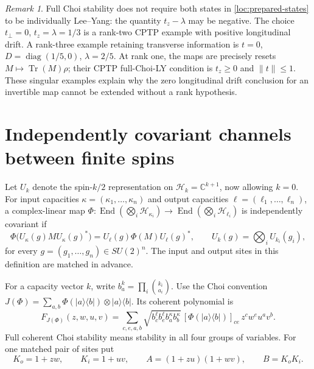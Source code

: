 \documentclass[reqno]{amsart}
\theoremstyle{definition}
\theoremstyle{remark}
\newtheorem{remark}[theorem]{Remark}
\newcommand{\C}{\mathbb C}
\DeclareMathOperator{\Tr}{Tr}
\DeclareMathOperator{\diag}{diag}
\begin{document}
\begin{remark}\label{loc:singular-distinction}
Full Choi stability does not require both states in
\eqref{loc:prepared-states} to be individually Lee--Yang: the quantity
$t_z-\lambda$ may be negative.  The choice
$t_\perp=0$, $t_z=\lambda=1/3$ is a rank-two CPTP example with
positive longitudinal drift.  A rank-three example retaining transverse
information is $t=0$, $D=\diag(1/5,0)$, $\lambda=2/5$.
At rank one, the maps are precisely resets
$M\mapsto\Tr(M)\rho$; their CPTP full-Choi-LY condition is
$t_z\geq0$ and $\|t\|\leq1$.
These singular examples explain why the zero longitudinal drift conclusion for an
invertible map cannot be extended without a rank hypothesis.
\end{remark}


\section{Independently covariant channels between finite spins}\label{spin:section}

Let $U_k$ denote the spin-$k/2$ representation on
$\mathcal H_k=\C^{k+1}$, now allowing $k=0$.
For input capacities $\kappa=(\kappa_1,\ldots,\kappa_n)$ and output
capacities $\ell=(\ell_1,\ldots,\ell_n)$, a complex-linear map
$\Phi:\operatorname{End}(\bigotimes_i\mathcal H_{\kappa_i})
\to\operatorname{End}(\bigotimes_i\mathcal H_{\ell_i})$
is independently covariant if
\begin{equation}\label{spin:covariance}
 \Phi\bigl(U_\kappa(g)MU_\kappa(g)^*\bigr)
 =U_\ell(g)\Phi(M)U_\ell(g)^*,\qquad
 U_k(g)=\bigotimes_iU_{k_i}(g_i),
\end{equation}
for every $g=(g_1,\ldots,g_n)\in SU(2)^n$.
The input and output sites in this definition are matched in advance.

For a capacity vector $k$, write $b^k_a=\prod_i\binom{k_i}{a_i}$.
Use the Choi convention
$J(\Phi)=\sum_{a,b}\Phi(|a\rangle\langle b|)\otimes
|a\rangle\langle b|$.  Its coherent polynomial is
\begin{equation}\label{spin:choi-weights}
 F_{J(\Phi)}(z,w,u,v)=
 \sum_{c,e,a,b}\sqrt{b^{\ell}_cb^{\ell}_e
                          b^{\kappa}_ab^{\kappa}_b}\,
 [\Phi(|a\rangle\langle b|)]_{ce}\,z^cw^eu^av^b.
\end{equation}
Full coherent Choi stability means stability in all four groups of
variables.  For one matched pair of sites put
\begin{equation}\label{spin:invariants}
 K_o=1+zw,\qquad K_i=1+uv,\qquad
 A=(1+zu)(1+wv),\qquad B=K_oK_i.
\end{equation}
\end{document}
